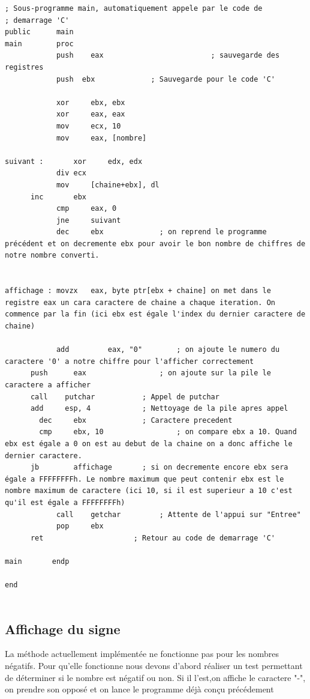 \documentclass[11pt]{report}
\begin{document}
\begin{lstlisting}
; Sous-programme main, automatiquement appele par le code de
; demarrage 'C'
public      main
main        proc
			push 	eax							; sauvegarde des registres
			push  ebx             ; Sauvegarde pour le code 'C'

			xor		ebx, ebx
			xor		eax, eax
			mov		ecx, 10
			mov		eax, [nombre]

suivant :		xor 	edx, edx
			div	ecx
			mov		[chaine+ebx], dl
      inc		ebx
			cmp		eax, 0
			jne		suivant
			dec		ebx             ; on reprend le programme précédent et on decremente ebx pour avoir le bon nombre de chiffres de notre nombre converti.


affichage : movzx   eax, byte ptr[ebx + chaine] on met dans le registre eax un cara caractere de chaine a chaque iteration. On commence par la fin (ici ebx est égale l'index du dernier caractere de chaine)

			add			eax, "0"        ; on ajoute le numero du caractere '0' a notre chiffre pour l'afficher correctement
      push   	eax         		; on ajoute sur la pile le caractere a afficher
      call    putchar     		; Appel de putchar
      add     esp, 4      		; Nettoyage de la pile apres appel
  		dec     ebx             ; Caractere precedent
	    cmp     ebx, 10 				; on compare ebx a 10. Quand ebx est égale a 0 on est au debut de la chaine on a donc affiche le dernier caractere.
      jb     	affichage       ; si on decremente encore ebx sera égale a FFFFFFFFh. Le nombre maximum que peut contenir ebx est le nombre maximum de caractere (ici 10, si il est superieur a 10 c'est qu'il est égale a FFFFFFFFh)
			call    getchar         ; Attente de l'appui sur "Entree"
			pop     ebx
      ret                     ; Retour au code de demarrage 'C'

main       endp

end


\end{lstlisting}


\subsection{Affichage du signe}

La méthode actuellement implémentée ne fonctionne pas pour les nombres négatifs.
Pour qu'elle fonctionne nous devons d'abord réaliser un test permettant de
déterminer si le nombre est négatif ou non.
Si il l'est,on affiche le caractere "-", on prendre son opposé
et on lance le programme déjà conçu précédement
\end{document}

